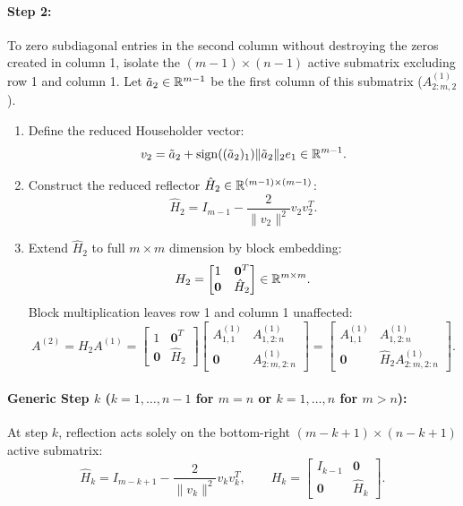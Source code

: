 \paragraph{Step 2:}
To zero subdiagonal entries in the second column without destroying the zeros created in column 1, isolate the $(m-1) \times (n-1)$ active submatrix excluding row 1 and column 1.
Let $\tilde{a}_2 \in \mathbb{R}^{m-1}$ be the first column of this submatrix ($A^{(1)}_{2:m, 2}$).
\begin{enumerate}
    \item Define the reduced Householder vector:
    \begin{equation}
        v_2 = \tilde{a}_2 + \operatorname{sign}((\tilde{a}_2)_1) \|\tilde{a}_2\|_2 e_1 \in \mathbb{R}^{m-1}.
    \end{equation}
    \item Construct the reduced reflector $\hat{H}_2 \in \mathbb{R}^{(m-1) \times (m-1)}$:
    \begin{equation}
        \hat{H}_2 = I_{m-1} - \frac{2}{\|v_2\|^2} v_2 v_2^T.
    \end{equation}
    \item Extend $\hat{H}_2$ to full $m \times m$ dimension by block embedding:
    \begin{equation}
        H_2 = \begin{bmatrix} 1 & \mathbf{0}^T \\ \mathbf{0} & \hat{H}_2 \end{bmatrix} \in \mathbb{R}^{m \times m}.
    \end{equation}
    Block multiplication leaves row 1 and column 1 unaffected:
    \begin{equation}
        A^{(2)} = H_2 A^{(1)} = \begin{bmatrix} 1 & \mathbf{0}^T \\ \mathbf{0} & \hat{H}_2 \end{bmatrix} \begin{bmatrix} A^{(1)}_{1,1} & A^{(1)}_{1, 2:n} \\ \mathbf{0} & A^{(1)}_{2:m, 2:n} \end{bmatrix} = \begin{bmatrix} A^{(1)}_{1,1} & A^{(1)}_{1, 2:n} \\ \mathbf{0} & \hat{H}_2 A^{(1)}_{2:m, 2:n} \end{bmatrix}.
    \end{equation}
\end{enumerate}

\paragraph{Generic Step $k$ ($k = 1, \dots, n-1$ for $m = n$ or $k = 1, \dots, n$ for $m > n$):}
At step $k$, reflection acts solely on the bottom-right $(m - k + 1) \times (n - k + 1)$ active submatrix:
\begin{equation}
    \hat{H}_k = I_{m-k+1} - \frac{2}{\|v_k\|^2} v_k v_k^T, \qquad H_k = \begin{bmatrix} I_{k-1} & \mathbf{0} \\ \mathbf{0} & \hat{H}_k \end{bmatrix}.
\end{equation}

